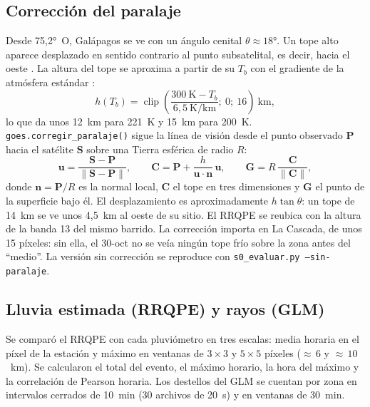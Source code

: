 \documentclass{sosg-informe}
\begin{document}
\subsection{Corrección del paralaje}
Desde 75,2°~O, Galápagos se ve con un ángulo cenital $\theta \approx 18$°. Un tope alto aparece desplazado en sentido contrario al punto subsatelital, es decir, hacia el oeste \citep{vicente2002}. La altura del tope se aproxima a partir de su $T_b$ con el gradiente de la atmósfera estándar \citep{ussa1976}:
\begin{equation}
  h(T_b) = \operatorname{clip}\!\left(\frac{300~\text{K} - T_b}{6,5~\text{K/km}};\ 0;\ 16\right)\ \text{km},
  \label{eq:altura}
\end{equation}
lo que da unos 12~km para 221~K y 15~km para 200~K. \texttt{goes.corregir\_paralaje()} sigue la línea de visión desde el punto observado $\mathbf{P}$ hacia el satélite $\mathbf{S}$ sobre una Tierra esférica de radio $R$:
\begin{equation}
  \mathbf{u} = \frac{\mathbf{S}-\mathbf{P}}{\lVert \mathbf{S}-\mathbf{P} \rVert}, \qquad
  \mathbf{C} = \mathbf{P} + \frac{h}{\mathbf{u}\cdot\mathbf{n}}\,\mathbf{u}, \qquad
  \mathbf{G} = R\, \frac{\mathbf{C}}{\lVert \mathbf{C} \rVert},
  \label{eq:paralaje}
\end{equation}
donde $\mathbf{n} = \mathbf{P}/R$ es la normal local, $\mathbf{C}$ el tope en tres dimensiones y $\mathbf{G}$ el punto de la superficie bajo él. El desplazamiento es aproximadamente $h \tan\theta$: un tope de 14~km se ve unos 4,5~km al oeste de su sitio. El RRQPE se reubica con la altura de la banda 13 del mismo barrido. La corrección importa en La Cascada, de unos 15 píxeles: sin ella, el 30-oct no se veía ningún tope frío sobre la zona antes del \enquote{medio}. La versión sin corrección se reproduce con \texttt{s0\_evaluar.py --sin-paralaje}.

\subsection{Lluvia estimada (RRQPE) y rayos (GLM)}
Se comparó el RRQPE con cada pluviómetro en tres escalas: media horaria en el píxel de la estación y máximo en ventanas de $3\times3$ y $5\times5$ píxeles (${\approx}\,6$ y ${\approx}\,10$~km). Se calcularon el total del evento, el máximo horario, la hora del máximo y la correlación de Pearson horaria. Los destellos del GLM se cuentan por zona en intervalos cerrados de 10~min (30 archivos de 20~s) y en ventanas de 30~min.
\end{document}
